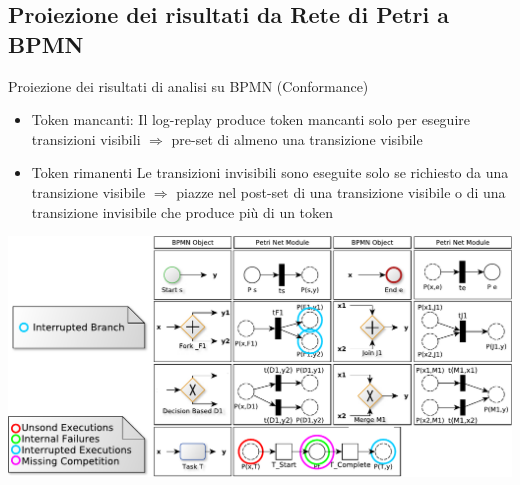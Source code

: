 \documentclass[10pt]{beamer}
\begin{document}
	\subsection{Proiezione dei risultati da Rete di Petri a BPMN}
	\begin{frame}{}
	  \begin{block}{Proiezione dei risultati di analisi su BPMN (Conformance)}
	    \begin{itemize}
	      \item \alert{Token mancanti}: Il log-replay produce token mancanti solo per eseguire transizioni visibili  $\Rightarrow$ pre-set di almeno una transizione visibile
	      \item \alert{Token rimanenti} Le transizioni invisibili sono eseguite solo se richiesto da una transizione visibile $\Rightarrow$ 
	        piazze nel  post-set di una transizione visibile  o di una transizione invisibile che produce pi\`{u} di un token
	
	    \end{itemize}
	  \end{block}
	  
	  \begin{center}
	    \includegraphics[scale=0.40]{./fig/MappingBPMNtoPN2}
	  \end{center}
	
	\end{frame}
	
	
\end{document}
